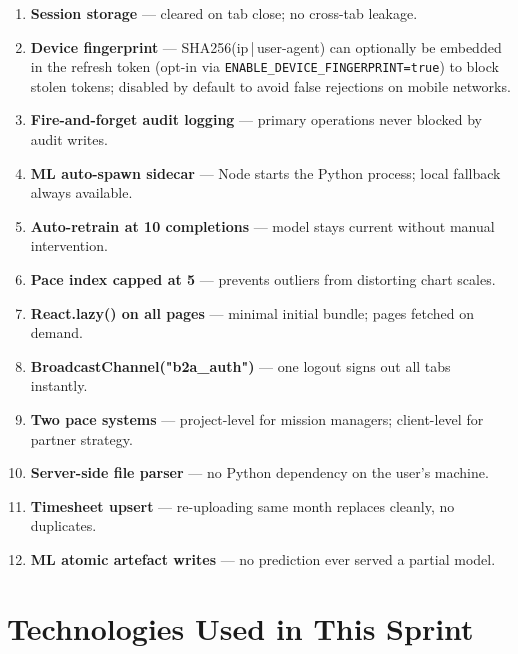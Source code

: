 \documentclass[12pt,a4paper]{report}
\begin{document}
\begin{enumerate}[leftmargin=*,noitemsep]
  \item \textbf{Session storage} --- cleared on tab close; no cross-tab leakage.
  \item \textbf{Device fingerprint} --- SHA256(ip\,|\,user-agent) can optionally be embedded in the refresh token (opt-in via \texttt{ENABLE\_DEVICE\_FINGERPRINT=true}) to block stolen tokens; disabled by default to avoid false rejections on mobile networks.
  \item \textbf{Fire-and-forget audit logging} --- primary operations never blocked by audit writes.
  \item \textbf{ML auto-spawn sidecar} --- Node starts the Python process; local fallback always available.
  \item \textbf{Auto-retrain at 10 completions} --- model stays current without manual intervention.
  \item \textbf{Pace index capped at 5} --- prevents outliers from distorting chart scales.
  \item \textbf{React.lazy() on all pages} --- minimal initial bundle; pages fetched on demand.
  \item \textbf{BroadcastChannel("b2a\_auth")} --- one logout signs out all tabs instantly.
  \item \textbf{Two pace systems} --- project-level for mission managers; client-level for partner strategy.
  \item \textbf{Server-side file parser} --- no Python dependency on the user's machine.
  \item \textbf{Timesheet upsert} --- re-uploading same month replaces cleanly, no duplicates.
  \item \textbf{ML atomic artefact writes} --- no prediction ever served a partial model.
\end{enumerate}

\section{Technologies Used in This Sprint}
\end{document}
